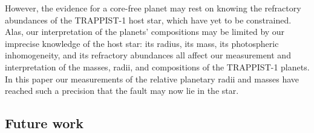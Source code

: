 \documentclass[twocolumn]{aastex63}
\begin{document}
However, the evidence for a core-free planet may rest on knowing the refractory abundances of the TRAPPIST-1 host star, which have yet to be constrained.  Alas, our interpretation of the planets' compositions may be limited by our imprecise knowledge of the host star:  its radius, its mass, its photospheric inhomogeneity, and its refractory abundances all affect our measurement and interpretation of the masses, radii, and compositions of the TRAPPIST-1 planets.  In this paper our measurements of the relative planetary radii and masses have reached such a precision that the fault may now lie in the star.



\subsection{Future work}
\end{document}
